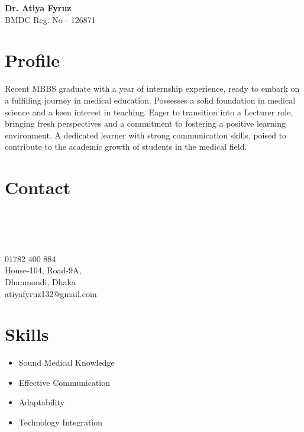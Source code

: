 \documentclass[a4paper,12pt]{article}
\begin{document}
\begin{minipage}[t]{\textwidth}
    \raggedright
    {\Huge\bfseries\color{black}Dr. Atiya Fyruz}\\
    \large{BMDC Reg. No - 126871}
    \vspace{1.5cm}    
\end{minipage}
\begin{minipage}[t][6.4cm]{\textwidth}
\section*{Profile}
  Recent MBBS graduate with a year of internship experience, ready to embark on a fulfilling journey in medical education. 
  Possesses a solid foundation in medical science and a keen interest in teaching. 
  Eager to transition into a Lecturer role, bringing fresh perspectives and a commitment to fostering a positive learning environment. 
  A dedicated learner with strong communication skills, poised to contribute to the academic growth of students in the medical field.
\end{minipage}
\begin{minipage}[t][12cm]{0.35\textwidth}
\raggedright
\section*{Contact}
    \begin{minipage}[t]{0.1\textwidth}
        \faPhone\\
        \faMapMarker\\ \\
        \faEnvelopeO
    \end{minipage}
    \begin{minipage}[t]{0.7\textwidth}
        01782 400 884\\
        House-104, Road-9A,\\ Dhanmondi, Dhaka\\
        atiyafyruz132@gmail.com
    \end{minipage}
\section*{Skills}
\begin{itemize}[left=0em, itemsep=0pt, parsep=0pt]
  \item Sound Medical Knowledge
  \item Effective Communication
  \item Adaptability
  \item Technology Integration
\end{itemize}

\end{minipage}
\end{document}
